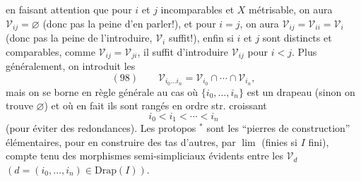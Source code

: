 
en faisant attention que pour $i$ et $j$ incomparables et $X$ métrisable, on  aura $\mathcal V_{ij}=\varnothing$  (donc pas la peine d'en parler!), et pour $i=j$, on aura $\mathcal V_{ij}=\mathcal V_{ii}=\mathcal V_i$ (donc pas la peine de l'introduire, $\mathcal V_i$ suffit!), enfin  si $i$ et $j$ sont distincts et comparables,  comme $\mathcal V_{ij}=\mathcal V_{ji}$, il suffit d'introduire $\mathcal V_{ij}$ pour  $i<j$. Plus généralement, on introduit les
\[(98)\qquad\mathcal V_{i_0\ldots i_n}=\mathcal V_{i_0}\cap\cdots\cap\mathcal V_{i_n},\]
mais on se borne en règle générale au cas où $\{i_0,\ldots,i_n\}$ est un drapeau (sinon on trouve $\varnothing$) et où en fait ils sont rangés en ordre str. croissant
\[i_0<i_1<\cdots<i_n\]
(pour éviter des redondances). Les protopos $^*$ sont les ``pierres de construction'' élémentaires, pour en construire des tas d'autres, par \uline{$\lim$} (finies si $I$ fini), compte tenu des morphismes semi-simpliciaux évidents entre les $\mathcal V_d$ $(d=(i_0,\ldots,i_n)\in\mathrm{Drap}(I))$.
